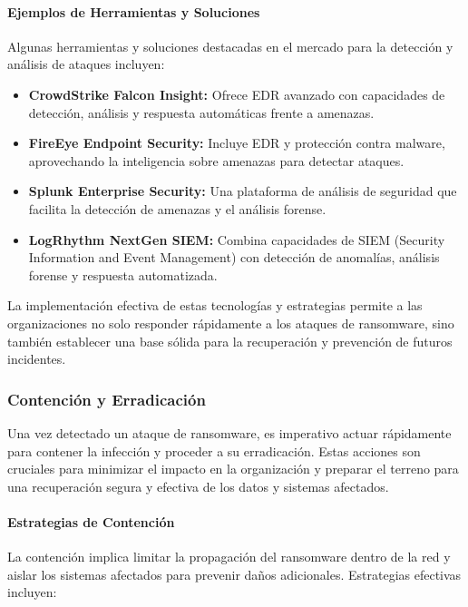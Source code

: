 \paragraph{Ejemplos de Herramientas y Soluciones}

Algunas herramientas y soluciones destacadas en el mercado para la detección y análisis de ataques incluyen:

\begin{itemize}
    \item \textbf{CrowdStrike Falcon Insight:} Ofrece EDR avanzado con capacidades de detección, análisis y respuesta automáticas frente a amenazas.
    \item \textbf{FireEye Endpoint Security:} Incluye EDR y protección contra malware, aprovechando la inteligencia sobre amenazas para detectar ataques.
    \item \textbf{Splunk Enterprise Security:} Una plataforma de análisis de seguridad que facilita la detección de amenazas y el análisis forense.
    \item \textbf{LogRhythm NextGen SIEM:} Combina capacidades de SIEM (Security Information and Event Management) con detección de anomalías, análisis forense y respuesta automatizada.
\end{itemize}

La implementación efectiva de estas tecnologías y estrategias permite a las organizaciones no solo responder rápidamente a los ataques de ransomware, sino también establecer una base sólida para la recuperación y prevención de futuros incidentes.



\subsubsection{Contención y Erradicación}

Una vez detectado un ataque de ransomware, es imperativo actuar rápidamente para contener la infección y proceder a su erradicación. Estas acciones son cruciales para minimizar el impacto en la organización y preparar el terreno para una recuperación segura y efectiva de los datos y sistemas afectados.

\paragraph{Estrategias de Contención}

La contención implica limitar la propagación del ransomware dentro de la red y aislar los sistemas afectados para prevenir daños adicionales. Estrategias efectivas incluyen:

